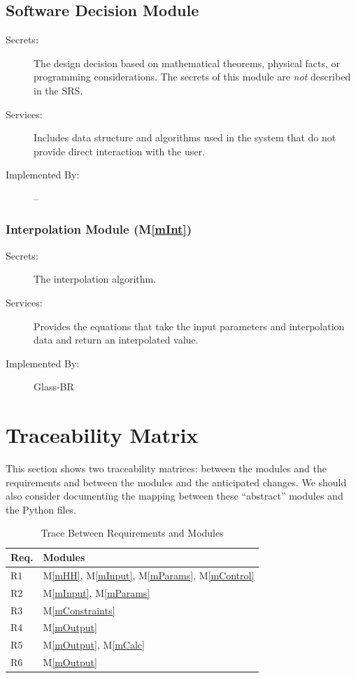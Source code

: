 \documentclass[12pt]{article}
\newcommand{\mref}[1]{M\ref{#1}}
\begin{document}
\subsection{Software Decision Module}

\begin{description}
\item[Secrets:] The design decision based on mathematical theorems, physical
  facts, or programming considerations. The secrets of this module are
  \emph{not} described in the SRS.
\item[Services:] Includes data structure and algorithms used in the system that
  do not provide direct interaction with the user. 
\item[Implemented By:] --
\end{description}

\subsubsection{Interpolation Module (\mref{mInt})}

\begin{description}
\item[Secrets:] The interpolation algorithm.
\item[Services:] Provides the equations that take the input parameters and 
interpolation data and return an interpolated value.
\item[Implemented By:] Glass-BR
\end{description}

\section{Traceability Matrix} \label{SecTM}

This section shows two traceability matrices: between the modules and the
requirements and between the modules and the anticipated changes.  We should
also consider documenting the mapping between these ``abstract'' modules and the
Python files.

\begin{table}[H]
\centering
\begin{tabular}{p{} p{}}
\toprule
\textbf{Req.} & \textbf{Modules}\\
\midrule
R1 & \mref{mHH}, \mref{mInput}, \mref{mParams}, \mref{mControl}\\
R2 & \mref{mInput}, \mref{mParams}\\
R3 & \mref{mConstraints}\\
R4 & \mref{mOutput}\\
R5 & \mref{mOutput}, \mref{mCalc}\\
R6 & \mref{mOutput}\\
\bottomrule
\end{tabular}
\caption{Trace Between Requirements and Modules}
\label{TblRT}
\end{table}
\end{document}
